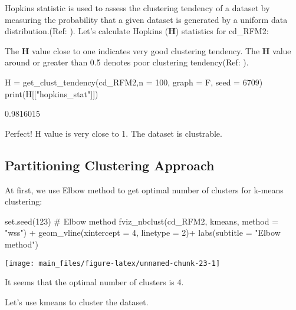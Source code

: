 Hopkins statistic is used to assess the clustering tendency of a dataset
by measuring the probability that a given dataset is generated by a
uniform data distribution.(Ref: \cite{mining}). Let's calculate Hopkins
(\textbf{H}) statistics for cd\_RFM2:

The \textbf{H} value close to one indicates very good clustering
tendency. The \textbf{H} value around or greater than 0.5 denotes poor
clustering tendency(Ref: \cite{factoextra}).

\begin{Schunk}
\begin{Sinput}
H =  get_clust_tendency(cd_RFM2,n = 100, graph = F, seed = 6709)
print(H[["hopkins_stat"]])
\end{Sinput}
\begin{Soutput}
[1] 0.9816015
\end{Soutput}
\end{Schunk}

Perfect! H value is very close to 1. The dataset is clustrable.

\hypertarget{partitioning-clustering-approach}{%
\subsection{Partitioning Clustering
Approach}\label{partitioning-clustering-approach}}

At first, we use Elbow method to get optimal number of clusters for
k-means clustering:

\begin{Schunk}
\begin{Sinput}
set.seed(123)
# Elbow method
fviz_nbclust(cd_RFM2, kmeans, method = "wss") +
    geom_vline(xintercept = 4, linetype = 2)+
  labs(subtitle = "Elbow method")
\end{Sinput}


\begin{center}\texttt{[image: main\_files/figure-latex/unnamed-chunk-23-1]} \end{center}

\end{Schunk}

It seems that the optimal number of clusters is 4.

Let's use kmeans to cluster the dataset.

